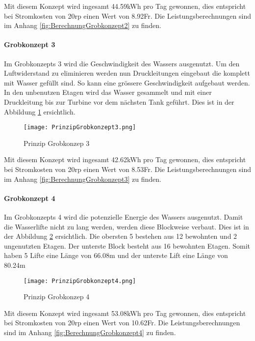 Mit diesem Konzept wird ingesamt 44.59\si{kWh} pro Tag gewonnen, dies entspricht bei Stromkosten von 20\si{rp} einen Wert von 8.92\si{Fr}. Die Leistungsberechnungen sind im Anhang \ref{fig:BerechnungGrobkonzept2}  zu finden.

\newpage

\paragraph{Grobkonzept 3}

Im Grobkonzepts 3 wird die Geschwindigkeit des Wassers ausgenutzt. Um den Luftwiderstand zu eliminieren werden nun Druckleitungen eingebaut die komplett mit Wasser gefüllt sind. So kann eine grössere Geschwindigkeit aufgebaut werden. In den unbenutzen Etagen wird das Wasser gesammelt und mit einer Druckleitung bis zur Turbine vor dem nächsten Tank geführt. Dies ist in der Abbildung \ref{fig:PrinzipGrobkonzept3}  ersichtlich. 

\begin{figure} [H]
	\centering
	\texttt{[image: PrinzipGrobkonzept3.png]}
	\caption{Prinzip Grobkonzep 3}
	\label{fig:PrinzipGrobkonzept3}
\end{figure}

Mit diesem Konzept wird ingesamt 42.62\si{kWh} pro Tag gewonnen, dies entspricht bei Stromkosten von 20\si{rp} einen Wert von 8.53\si{Fr}. Die Leistungsberechnungen sind im Anhang \ref{fig:BerechnungGrobkonzept3}  zu finden.

\newpage

\paragraph{Grobkonzept 4}

Im Grobkonzepts 4 wird die potenzielle Energie des Wassers ausgenutzt. Damit die Wasserlifte nicht zu lang werden, werden diese Blockweise verbaut. Dies ist in der Abbildung \ref{fig:PrinzipGrobkonzept4}  ersichtlich. Die obersten 5 bestehen aus 12 bewohnten und 2 ungenutzten Etagen. Der unterste Block besteht aus 16 bewohnten Etagen. Somit haben 5 Lifte eine Länge von 66.08\si{m} und der unterste Lift eine Länge von 80.24\si{m}

\begin{figure} [H]
	\centering
	\texttt{[image: PrinzipGrobkonzept4.png]}
	\caption{Prinzip Grobkonzep 4}
	\label{fig:PrinzipGrobkonzept4}
\end{figure}

Mit diesem Konzept wird ingesamt 53.08\si{kWh} pro Tag gewonnen, dies entspricht bei Stromkosten von 20\si{rp} einen Wert von 10.62\si{Fr}. Die Leistungsberechnungen sind im Anhang \ref{fig:BerechnungGrobkonzept4}  zu finden.

\newpage